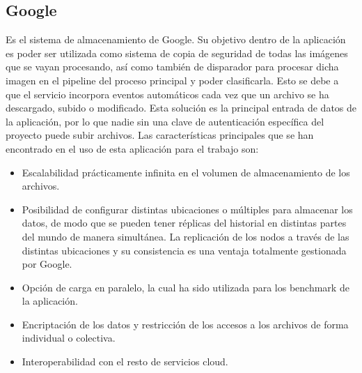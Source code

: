 \subsection{Google }\label{subsec:storage}
Es el sistema de almacenamiento de Google\cite{data_warehousing}.
Su objetivo dentro de la aplicación es poder ser utilizada como sistema de copia de seguridad de todas las imágenes que se vayan procesando, así como también de disparador para procesar dicha imagen en el pipeline del proceso principal y poder clasificarla.
Esto se debe a que el servicio incorpora eventos automáticos cada vez que un archivo se ha descargado, subido o modificado.
Esta solución es la principal entrada de datos de la aplicación, por lo que nadie sin una clave de autenticación específica del proyecto puede subir archivos.
Las características principales que se han encontrado en el uso de esta aplicación para el trabajo son:
\begin{itemize}
    \item Escalabilidad prácticamente infinita en el volumen de almacenamiento de los archivos.
    \item Posibilidad de configurar distintas ubicaciones o múltiples para almacenar los datos, de modo que se pueden tener réplicas del historial en distintas partes del mundo de manera simultánea.
    La replicación de los nodos a través de las distintas ubicaciones y su consistencia es una ventaja totalmente gestionada por Google.
    \item Opción de carga en paralelo, la cual ha sido utilizada para los benchmark de la aplicación.
    \item Encriptación de los datos y restricción de los accesos a los archivos de forma individual o colectiva.
    \item Interoperabilidad con el resto de servicios cloud.
\end{itemize}

